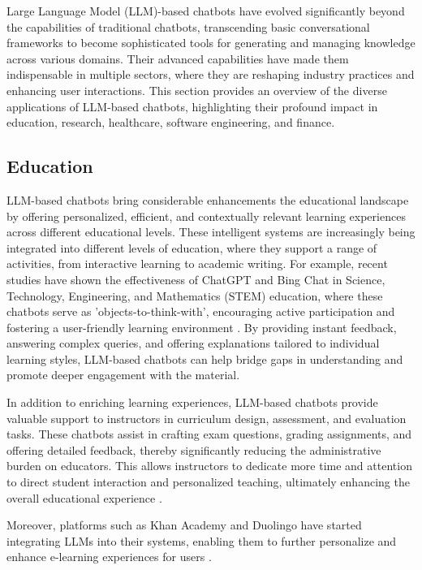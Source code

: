 Large Language Model (LLM)-based chatbots have evolved significantly beyond the capabilities of traditional chatbots, transcending basic conversational frameworks to become sophisticated tools for generating and managing knowledge across various domains. Their advanced capabilities have made them indispensable in multiple sectors, where they are reshaping industry practices and enhancing user interactions. This section provides an overview of the diverse applications of LLM-based chatbots, highlighting their profound impact in education, research, healthcare, software engineering, and finance.

\subsection{Education}

LLM-based chatbots bring considerable enhancements the educational landscape by offering personalized, efficient, and contextually relevant learning experiences across different educational levels. These intelligent systems are increasingly being integrated into different levels of education, where they support a range of activities, from interactive learning to academic writing. For example, recent studies have shown the effectiveness of ChatGPT and Bing Chat in Science, Technology, Engineering, and Mathematics (STEM) education, where these chatbots serve as 'objects-to-think-with', encouraging active participation and fostering a user-friendly learning environment \cite{vasconcelos2023enhancing}. By providing instant feedback, answering complex queries, and offering explanations tailored to individual learning styles, LLM-based chatbots can help bridge gaps in understanding and promote deeper engagement with the material.

In addition to enriching learning experiences, LLM-based chatbots provide valuable support to instructors in curriculum design, assessment, and evaluation tasks. These chatbots assist in crafting exam questions, grading assignments, and offering detailed feedback, thereby significantly reducing the administrative burden on educators. This allows instructors to dedicate more time and attention to direct student interaction and personalized teaching, ultimately enhancing the overall educational experience \cite{dam2024complete}.

Moreover, platforms such as Khan Academy and Duolingo have started integrating LLMs into their systems, enabling them to further personalize and enhance e-learning experiences for users \cite{khan2023harnessing, Duolingo2023}.

